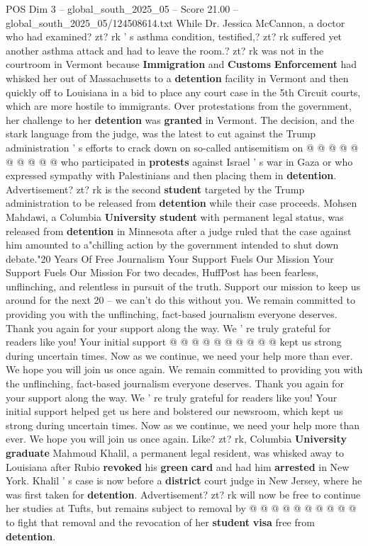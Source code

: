 \begin{textsample}{POS Dim 3 – global\_south\_2025\_05 – Score 21.00 – global\_south\_2025\_05/124508614.txt}
While Dr.
Jessica McCannon, a doctor who had examined? zt? rk ' s asthma condition, testified,? zt? rk suffered yet another asthma attack and had to leave the room.? zt? rk was not in the courtroom in Vermont because \textbf{Immigration} and \textbf{Customs} \textbf{Enforcement} had whisked her out of Massachusetts to a \textbf{detention} facility in Vermont and then quickly off to Louisiana in a bid to place any court case in the 5th Circuit courts, which are more hostile to immigrants.
Over protestations from the government, her challenge to her \textbf{detention} was \textbf{granted} in Vermont.
The decision, and the stark language from the judge, was the latest to cut against the Trump administration ' s efforts to crack down on so-called antisemitism on @ @ @ @ @ @ @ @ @ @ who participated in \textbf{protests} against Israel ' s war in Gaza or who expressed sympathy with Palestinians and then placing them in \textbf{detention}.
Advertisement? zt? rk is the second \textbf{student} targeted by the Trump administration to be released from \textbf{detention} while their case proceeds.
Mohsen Mahdawi, a Columbia \textbf{University} \textbf{student} with permanent legal status, was released from \textbf{detention} in Minnesota after a judge ruled that the case against him amounted to a"chilling action by the government intended to shut down debate."20 Years Of Free Journalism Your Support Fuels Our Mission Your Support Fuels Our Mission For two decades, HuffPost has been fearless, unflinching, and relentless in pursuit of the truth.
Support our mission to keep us around for the next 20 -- we can't do this without you.
We remain committed to providing you with the unflinching, fact-based journalism everyone deserves.
Thank you again for your support along the way.
We ' re truly grateful for readers like you!
Your initial support @ @ @ @ @ @ @ @ @ @ kept us strong during uncertain times.
Now as we continue, we need your help more than ever.
We hope you will join us once again.
We remain committed to providing you with the unflinching, fact-based journalism everyone deserves.
Thank you again for your support along the way.
We ' re truly grateful for readers like you!
Your initial support helped get us here and bolstered our newsroom, which kept us strong during uncertain times.
Now as we continue, we need your help more than ever.
We hope you will join us once again.
Like? zt? rk, Columbia \textbf{University} \textbf{graduate} Mahmoud Khalil, a permanent legal resident, was whisked away to Louisiana after Rubio \textbf{revoked} his \textbf{green} \textbf{card} and had him \textbf{arrested} in New York.
Khalil ' s case is now before a \textbf{district} court judge in New Jersey, where he was first taken for \textbf{detention}.
Advertisement? zt? rk will now be free to continue her studies at Tufts, but remains subject to removal by @ @ @ @ @ @ @ @ @ @ to fight that removal and the revocation of her \textbf{student} \textbf{visa} free from \textbf{detention}.

\end{textsample}
